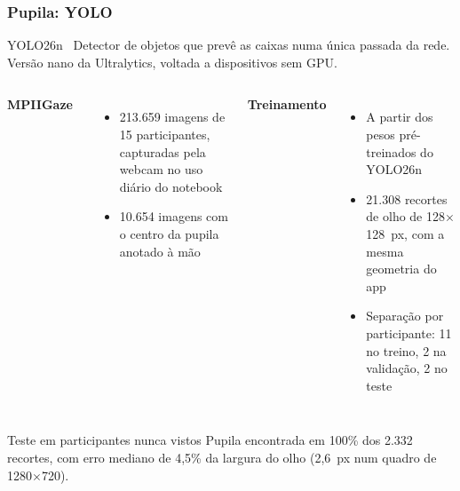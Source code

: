 \documentclass{UnBeamer}
\begin{document}
\subsubsection{Pupila: YOLO}
\begin{frame}
    \small
    \begin{block}{YOLO26n~\cite{yolo,yolo26}}
        Detector de objetos que prevê as caixas numa única passada da rede. \\
        Versão nano da Ultralytics, voltada a dispositivos sem GPU.
    \end{block}
    \begin{columns}[T]
            {\textbf{MPIIGaze~\cite{mpiigaze}}}
            \begin{itemize}
                \item 213.659 imagens de 15 participantes, capturadas pela
                      webcam no uso diário do notebook
                \item 10.654 imagens com o centro da pupila anotado à mão
            \end{itemize}
            {\textbf{Treinamento}}
            \begin{itemize}
                \item A partir dos pesos pré-treinados do YOLO26n
                \item 21.308 recortes de olho de 128$\times$128~px,
                      com a mesma geometria do app
                \item Separação por participante: 11 no treino,
                      2 na validação, 2 no teste
            \end{itemize}
    \end{columns}
    \begin{exampleblock}{Teste em participantes nunca vistos} Pupila encontrada em 100\% dos 2.332 recortes, com erro mediano de 4,5\% da largura do olho (2,6~px num quadro de 1280$\times$720).
    \end{exampleblock}
\end{frame}
\end{document}
